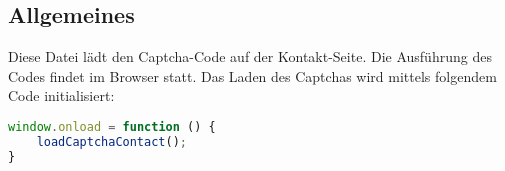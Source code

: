 \subsection{Allgemeines} Diese Datei lädt den Captcha-Code auf der Kontakt-Seite.
Die Ausführung des Codes findet im Browser statt. Das Laden des Captchas wird mittels folgendem Code initialisiert:
\begin{lstlisting}[language=JavaScript]
window.onload = function () {
	loadCaptchaContact();
}
\end{lstlisting}
